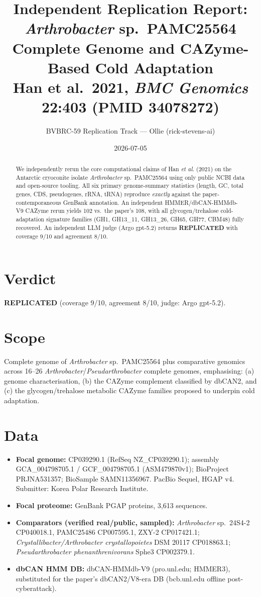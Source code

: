 \documentclass[11pt]{article}
\title{Independent Replication Report: \\
\emph{Arthrobacter} sp.\ PAMC25564 Complete Genome and CAZyme-Based Cold Adaptation \\
{\large Han et al.\ 2021, \textit{BMC Genomics} 22:403 (PMID 34078272)}}
\author{BVBRC-59 Replication Track --- Ollie (rick-stevens-ai)}
\date{2026-07-05}
\begin{document}
\maketitle

\begin{abstract}
We independently rerun the core computational claims of Han \emph{et al.} (2021) on the Antarctic cryoconite isolate \emph{Arthrobacter} sp.\ PAMC25564 using only public NCBI data and open-source tooling. All six primary genome-summary statistics (length, GC, total genes, CDS, pseudogenes, rRNA, tRNA) reproduce \emph{exactly} against the paper-contemporaneous GenBank annotation. An independent HMMER/dbCAN-HMMdb-V9 CAZyme rerun yields 102 vs.\ the paper's 108, with all glycogen/trehalose cold-adaptation signature families (GH1, GH13\_11, GH13\_26, GH65, GH77, CBM48) fully recovered. An independent LLM judge (Argo gpt-5.2) returns \textbf{REPLICATED} with coverage 9/10 and agreement 8/10.
\end{abstract}

\section{Verdict}
\textbf{REPLICATED} \quad (coverage 9/10, agreement 8/10, judge: Argo gpt-5.2).

\section{Scope}
Complete genome of \emph{Arthrobacter} sp.\ PAMC25564 plus comparative genomics across 16--26 \emph{Arthrobacter}/\emph{Pseudarthrobacter} complete genomes, emphasising: (a) genome characterisation, (b) the CAZyme complement classified by dbCAN2, and (c) the glycogen/trehalose metabolic CAZyme families proposed to underpin cold adaptation.

\section{Data}
\begin{itemize}
  \item \textbf{Focal genome:} CP039290.1 (RefSeq NZ\_CP039290.1); assembly GCA\_004798705.1 / GCF\_004798705.1 (ASM479870v1); BioProject PRJNA531357; BioSample SAMN11356967. PacBio Sequel, HGAP v4. Submitter: Korea Polar Research Institute.
  \item \textbf{Focal proteome:} GenBank PGAP proteins, 3{,}613 sequences.
  \item \textbf{Comparators (verified real/public, sampled):} \emph{Arthrobacter} sp.\ 24S4-2 CP040018.1, PAMC25486 CP007595.1, ZXY-2 CP017421.1; \emph{Crystallibacter/Arthrobacter crystallopoietes} DSM 20117 CP018863.1; \emph{Pseudarthrobacter phenanthrenivorans} Sphe3 CP002379.1.
  \item \textbf{dbCAN HMM DB:} dbCAN-HMMdb-V9 (pro.unl.edu; HMMER3), substituted for the paper's dbCAN2/V8-era DB (bcb.unl.edu offline post-cyberattack).
\end{itemize}
\end{document}
